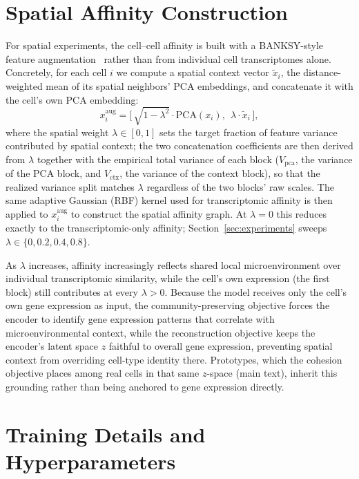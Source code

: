 \section{Spatial Affinity Construction}
\label{app:spatial_affinity}

For spatial experiments, the cell--cell affinity is built with a BANKSY-style feature augmentation~\citep{banksy} rather than from individual cell transcriptomes alone.
Concretely, for each cell $i$ we compute a spatial context vector $\tilde{x}_i$, the distance-weighted mean of its spatial neighbors' PCA embeddings, and concatenate it with the cell's own PCA embedding:
\begin{equation}
x_i^{\text{aug}} = \big[\, \sqrt{1-\lambda^2}\cdot \mathrm{PCA}(x_i),\ \ \lambda \cdot \tilde{x}_i \,\big],
\end{equation}
where the spatial weight $\lambda \in [0,1]$ sets the target fraction of feature variance contributed by spatial context; the two concatenation coefficients are then derived from $\lambda$ together with the empirical total variance of each block ($V_{\text{pca}}$, the variance of the PCA block, and $V_{\text{ctx}}$, the variance of the context block), so that the realized variance split matches $\lambda$ regardless of the two blocks' raw scales.
The same adaptive Gaussian (RBF) kernel used for transcriptomic affinity is then applied to $x_i^{\text{aug}}$ to construct the spatial affinity graph.
At $\lambda=0$ this reduces exactly to the transcriptomic-only affinity; Section~\ref{sec:experiments} sweeps $\lambda \in \{0, 0.2, 0.4, 0.8\}$.

As $\lambda$ increases, affinity increasingly reflects shared local microenvironment over individual transcriptomic similarity, while the cell's own expression (the first block) still contributes at every $\lambda>0$.
Because the model receives only the cell's own gene expression as input, the community-preserving objective forces the encoder to identify gene expression patterns that correlate with microenvironmental context, while the reconstruction objective keeps the encoder's latent space $z$ faithful to overall gene expression, preventing spatial context from overriding cell-type identity there. Prototypes, which the cohesion objective places among real cells in that same $z$-space (main text), inherit this grounding rather than being anchored to gene expression directly.


\section{Training Details and Hyperparameters}
\label{app:training}

